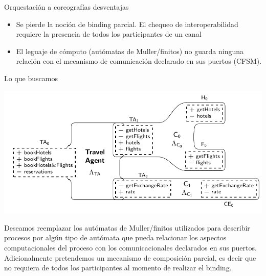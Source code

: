 \documentclass[10pt,xcolor={table,dvipsnames},t]{beamer}
\begin{document}
\begin{frame}{Orquestación a coreografías desventajas}
 \begin{itemize}
    \item Se pierde la noción de binding parcial. El chequeo de interoperabilidad requiere la presencia de todos los participantes de un canal
    \item El leguaje de cómputo (autómatas de Muller/finitos) no guarda ninguna relación con el mecanismo de comunicación declarado en sus puertos (CFSM).
     \end{itemize}
\end{frame}

    

\begin{frame}{Lo que buscamos}
\begin{center}
    \includegraphics[scale=0.5]{images/ARN0.png}
\end{center}
Deseamos reemplazar los autómatas de Muller/finitos utilizados para describir procesos por algún tipo de autómata que pueda relacionar los aspectos computacionales del proceso con los comunicacionales declarados en sus puertos. Adicionalmente pretendemos un mecanismo de composición parcial, es decir que no requiera de todos los participantes al momento de realizar el binding.
\end{frame}
\end{document}
